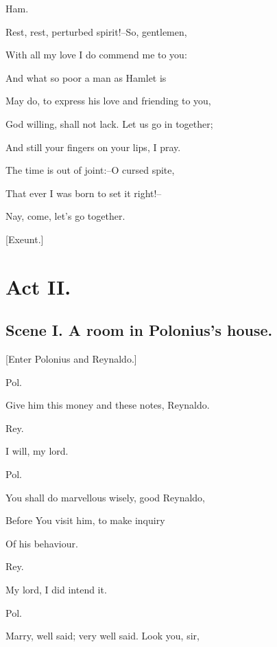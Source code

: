 \documentclass[12pt]{book}
\begin{document}
Ham.

Rest, rest, perturbed spirit!--So, gentlemen,

With all my love I do commend me to you:

And what so poor a man as Hamlet is

May do, to express his love and friending to you,

God willing, shall not lack. Let us go in together;

And still your fingers on your lips, I pray.

The time is out of joint:--O cursed spite,

That ever I was born to set it right!--

Nay, come, let's go together.



[Exeunt.]







\chapter*{Act II.}



\section*{Scene I. A room in Polonius's house.}



[Enter Polonius and Reynaldo.]



Pol.

Give him this money and these notes, Reynaldo.



Rey.

I will, my lord.



Pol.

You shall do marvellous wisely, good Reynaldo,

Before You visit him, to make inquiry

Of his behaviour.



Rey.

My lord, I did intend it.



Pol.

Marry, well said; very well said. Look you, sir,
\end{document}
